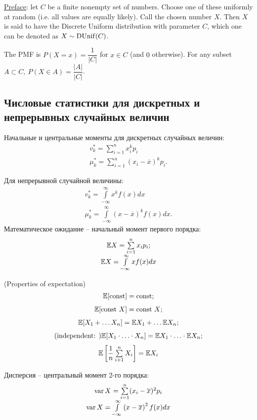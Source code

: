 \par 
\underline{Preface}: let $C$ be a finite nonempty set of numbers. Choose one of these uniformly at random (i.e. all values are equally likely). Call the chosen number $X$. Then $X$ is said to have the Discrete Uniform distribution with parameter $C$, which one can be denoted as $X \sim \operatorname{DUnif}(C)$.

\begin{note}{}{}
    The PMF is $P(X = x) = \dfrac{1}{|C|}$ for $x \in C$ (and $0$ otherwise). For any subset $A \subset C, \ P(X \in A) = \dfrac{|A|}{|C|}$.
\end{note}

\subsection*{Числовые статистики для дискретных и непрерывных случайных величин}
\par
Начальные и центральные моменты для дискретных случайных величин:
\[
    \begin{array}{c}
        v^*_k = \sum\limits_{i=1}^{n} x^k_i p_i\\
        \mu_k^* = \sum\limits_{i=1}^{n} \left(x_i - \overline{x}\right)^kp_i.
    \end{array}
\]
\par 
Для непрерывной случайной величины:
\[
    \begin{array}{c}
    v_k^* = \int\limits_{-\infty}^{\infty} x^k f(x)dx\\
    \mu_k^* = \int\limits_{-\infty}^{\infty} \left(x - \overline{x}\right)^kf(x)dx.
    \end{array}
\]
Математическое ожидание -- начальный момент первого порядка:
\[
    \begin{array}{c}
    \mathbb{E} X = \sum\limits_{i=1}^n x_ip_i;\\
    \mathbb{E} X = \int\limits_{-\infty}^\infty xf(x)dx
    \end{array}  
\]
\begin{theorema}{(Properties of expectation)}{}
    \[
        \begin{array}{c}
            \mathbb{E}[\text{const}] = \text{const} ;\\[0.25cm]
            \mathbb{E}[\text{const } X] = \text{const } X;\\[0.25cm]
            \mathbb{E}[X_1 + \ldots X_n] = \mathbb{E} X_1 + \ldots \mathbb{E} X_n;\\[0.25cm]
            (\text{independent: }) \mathbb{E}[X_1 \cdot \ldots \cdot X_n] = \mathbb{E} X_1 \cdot \ldots \cdot \mathbb{E} X_n;\\[0.25cm]
            \mathbb{E} \left[\dfrac{1}{n}\sum\limits_{i+1}^nX_i\right] = \mathbb{E} X_i
        \end{array}  
    \]
\end{theorema}
\par
Дисперсия -- центральный момент 2-го порядка:
\[
    \begin{array}{c}
        \operatorname{var} X = \sum\limits_{i=1}^n (x_i - \overline{x})^2 p_i\\
        \operatorname{var} X = \int\limits_{-\infty}^\infty \left(x - \overline{x}\right)^2f(x) dx
    \end{array}  
\]

